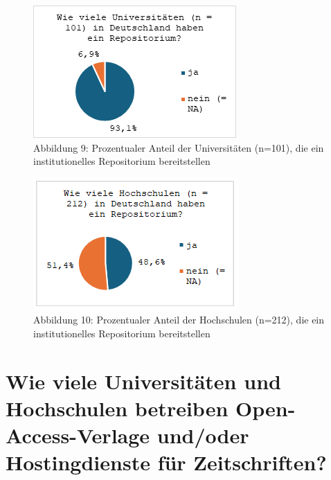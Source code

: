 \documentclass[a4paper,
fontsize=11pt,
oneside,
numbers=noperiodatend,
parskip=half-,
bibliography=totoc,
final
]{scrartcl}
\begin{document}
\begin{figure}[H]
\centering
\includegraphics[]{img/image010.png}
\caption{Abbildung 9: Prozentualer Anteil der Universitäten (n=101), die ein institutionelles Repositorium bereitstellen}
\end{figure}

\begin{figure}[H]
\centering
\includegraphics[]{img/image009.png}
\caption{Abbildung 10: Prozentualer Anteil der Hochschulen (n=212), die ein institutionelles Repositorium bereitstellen}
\end{figure}

\section{Wie viele Universitäten und Hochschulen betreiben
Open-Access-Verlage und/oder Hostingdienste für
Zeitschriften?}\label{wie-viele-universituxe4ten-und-hochschulen-betreiben-open-access-verlage-undoder-hostingdienste-fuxfcr-zeitschriften}
\end{document}
